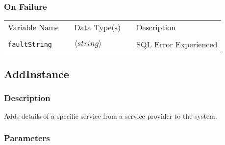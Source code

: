 \subsubsection{On Failure}

\begin{tabular}{lllll}
Variable Name	&		&	Data Type(s)		&	&	Description	\\
				&	&	&	&	\\
\verb!faultString! & \hspace{15mm} & $\langle string\rangle $ & \hspace{15mm} & SQL Error Experienced \\
\end{tabular}


\subsection{AddInstance}

\subsubsection{Description}

Adds details of a specific service from a service provider to the
system.  

\subsubsection{Parameters}


